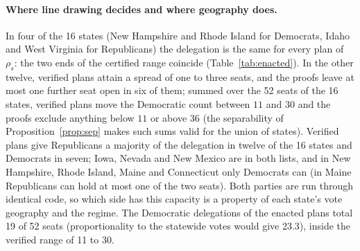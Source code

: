 \paragraph{Where line drawing decides and where geography does.}
In four of the 16 states (New Hampshire and Rhode Island for Democrats, Idaho and West Virginia for Republicans) the delegation is the same for every plan of $\rho_s$: the two ends of the certified range coincide (Table~\ref{tab:enacted}). In the other twelve, verified plans attain a spread of one to three seats, and the proofs leave at most one further seat open in six of them; summed over the 52 seats of the 16 states, verified plans move the Democratic count between $11$ and $30$ and the proofs exclude anything below $11$ or above $36$ (the separability of Proposition~\ref{prop:sep} makes such sums valid for the union of states). Verified plans give Republicans a majority of the delegation in twelve of the 16 states and Democrats in seven; Iowa, Nevada and New Mexico are in both lists, and in New Hampshire, Rhode Island, Maine and Connecticut only Democrats can (in Maine Republicans can hold at most one of the two seats). Both parties are run through identical code, so which side has this capacity is a property of each state's vote geography and the regime. The Democratic delegations of the enacted plans total 19 of 52 seats (proportionality to the statewide votes would give 23.3), inside the verified range of 11 to 30.

